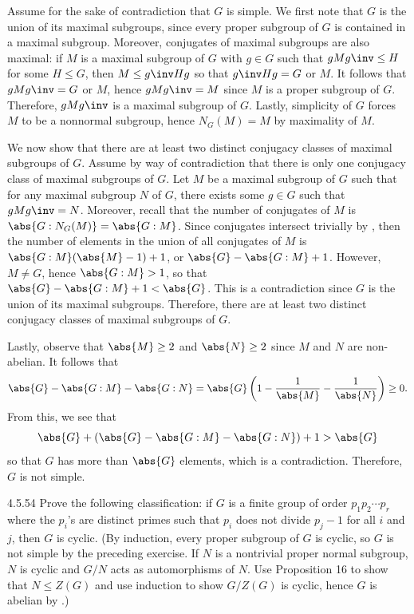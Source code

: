 \begin{sol}
	Assume for the sake of contradiction that $G$ is simple.
	We first note that $G$ is the union of its maximal subgroups, since every proper subgroup of $G$ is contained in a maximal subgroup.
	Moreover, conjugates of maximal subgroups are also maximal: if $M$ is a maximal subgroup of $G$ with $g \in G$ such that $gMg \inv \leq H$ for some $H \leq G$, then $M \leq g\inv Hg$ so that $g\inv Hg = G$ or $M$.
	It follows that $gMg\inv = G$ or $M$, hence $gMg\inv = M$ since $M$ is a proper subgroup of $G$.
	Therefore, $gMg\inv$ is a maximal subgroup of $G$.
	Lastly, simplicity of $G$ forces $M$ to be a nonnormal subgroup, hence $N_G(M) = M$ by maximality of $M$.

	We now show that there are at least two distinct conjugacy classes of maximal subgroups of $G$.
	Assume by way of contradiction that there is only one conjugacy class of maximal subgroups of $G$.
	Let $M$ be a maximal subgroup of $G$ such that for any maximal subgroup $N$ of $G$, there exists some $g \in G$ such that $gMg\inv = N$.
	Moreover, recall that the number of conjugates of $M$ is $\abs{G : N_G(M)} = \abs{G : M}$.
	Since conjugates intersect trivially by , then the number of elements in the union of all conjugates of $M$ is $\abs{G : M}(\abs{M} - 1) + 1$, or $\abs{G} - \abs{G : M} + 1$.
	However, $M \neq G$, hence $\abs{G : M} > 1$, so that $\abs{G} - \abs{G : M} + 1 < \abs{G}$.
	This is a contradiction since $G$ is the union of its maximal subgroups.
	Therefore, there are at least two distinct conjugacy classes of maximal subgroups of $G$.

	Lastly, observe that $\abs{M} \geq 2$ and $\abs{N} \geq 2$ since $M$ and $N$ are non-abelian.
	It follows that
	\[
		\abs{G} - \abs{G : M} - \abs{G : N} = \abs{G}\left(1 - \frac{1}{\abs{M}} - \frac{1}{\abs{N}}\right) \geq 0.
	\]
	From this, we see that
	\[
		\abs{G} + (\abs{G} - \abs{G : M} - \abs{G : N}) + 1 > \abs{G}
	\]
	so that $G$ has more than $\abs{G}$ elements, which is a contradiction.
	Therefore, $G$ is not simple.
\end{sol}

\begin{exercise}{4.5.54}
	Prove the following classification: if $G$ is a finite group of order $p_1p_2 \cdots p_r$ where the $p_i$'s are distinct primes such that $p_i$ does not divide $p_j - 1$ for all $i$ and $j$, then $G$ is cyclic. (By induction, every proper subgroup of $G$ is cyclic, so $G$ is not simple by the preceding exercise.
	If $N$ is a nontrivial proper normal subgroup, $N$ is cyclic and $G/N$ acts as automorphisms of $N$.
	Use Proposition 16 to show that $N \leq Z(G)$ and use induction to show $G/Z(G)$ is cyclic, hence $G$ is abelian by .)
\end{exercise}

